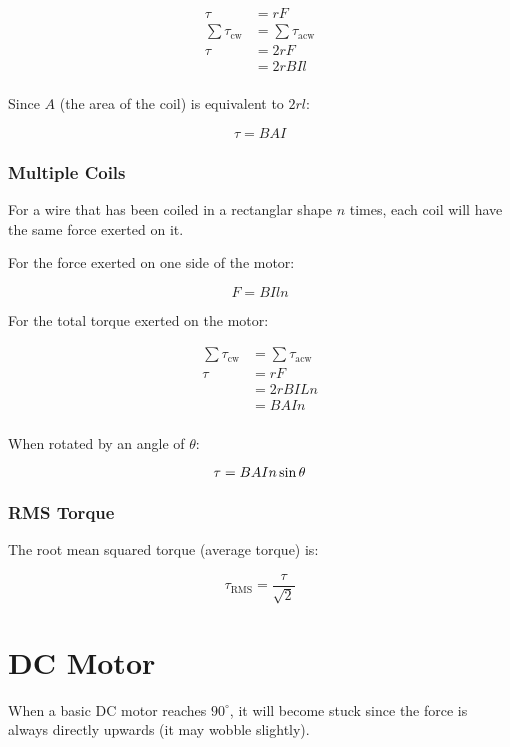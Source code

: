 \documentclass[a4paper,11pt]{article}
\begin{document}
$$
\begin{aligned}
\tau & = rF \\
\sum \tau_{\mbox{cw}} & = \sum \tau_{\mbox{acw}} \\
\tau & = 2rF \\
& = 2rBIl \\
\end{aligned}
$$

Since $A$ (the area of the coil) is equivalent to $2rl$:

$$
\tau = BAI
$$


\subsubsection{Multiple Coils}

For a wire that has been coiled in a rectanglar shape $n$ times, each coil will
have the same force exerted on it.

For the force exerted on one side of the motor:

$$
F = BIln
$$

For the total torque exerted on the motor:

$$
\begin{aligned}
\sum \tau_{\mbox{cw}} & = \sum \tau_{\mbox{acw}} \\
\tau & = rF \\
& = 2r BILn \\
& = BAIn \\
\end{aligned}
$$

When rotated by an angle of $\theta$:

$$
\tau = BAIn \sin{\theta} \\
$$


\subsubsection{RMS Torque}

The root mean squared torque (average torque) is:

$$
\tau_{\mbox{RMS}} = \frac{\tau}{\sqrt{2}}
$$




\section{DC Motor}

When a basic DC motor reaches $90^\circ$, it will become stuck since the force
is always directly upwards (it may wobble slightly).
\end{document}
